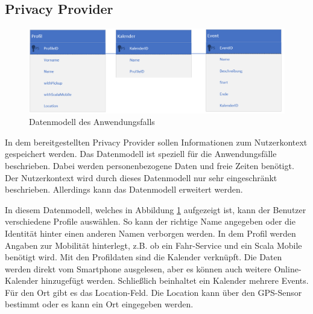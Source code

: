 \subsection{Privacy Provider}

\setcounter{figure}{8}  
\begin{figure}[!ht]
	\centering
	\includegraphics[width=1\linewidth]{Picture/Datenmodell}
	\caption[Datenmodell]{Datenmodell des Anwendungsfalls}
	\label{fig:datenmodell}
\end{figure}

In dem bereitgestellten Privacy Provider sollen Informationen zum Nutzerkontext gespeichert werden. Das Datenmodell ist speziell für die Anwendungsfälle beschrieben. Dabei werden personenbezogene Daten und freie Zeiten benötigt. Der Nutzerkontext wird durch dieses Datenmodell nur sehr eingeschränkt beschrieben. Allerdings kann das Datenmodell erweitert werden.

In diesem Datenmodell, welches in Abbildung \ref{fig:datenmodell} aufgezeigt ist, kann der Benutzer verschiedene Profile auswählen. So kann der richtige Name angegeben oder die Identität hinter einen anderen Namen verborgen werden. In dem Profil werden Angaben zur Mobilität hinterlegt, z.B. ob ein Fahr-Service und ein Scala Mobile benötigt wird. Mit den Profildaten sind die Kalender verknüpft. Die Daten werden direkt vom Smartphone ausgelesen, aber es können auch weitere Online-Kalender hinzugefügt werden. Schließlich beinhaltet ein Kalender mehrere Events. Für den Ort gibt es das Location-Feld. Die Location kann über den GPS-Sensor bestimmt oder es kann ein Ort eingegeben werden.
